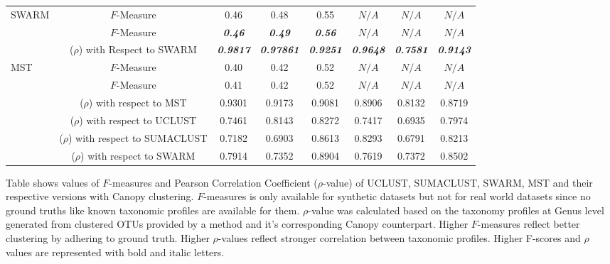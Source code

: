 \documentclass[10pt, conference, compsocconf]{IEEEtran}
\begin{document}
\begin{table}[t]
{\begin{tabular}{|l|c c c c| c c c|}
			\hline
			
			\multirow{1}{*}{SWARM} & $F$-Measure & 0.46 & 0.48 & 0.55 & $N/A$ & $N/A$ & $N/A$\\
			
			\hdashline
			
			\multirow{2}{*}{CC$_{SWARM}$} & $F$-Measure & \textit{\textbf{0.46}} & \textit{\textbf{0.49}} & \textit{\textbf{0.56}} & $N/A$ & $N/A$ & $N/A$\\
			& ($\rho$) with Respect to SWARM & \textit{\textbf{0.9817}} & \textit{\textbf{0.97861}} & \textit{\textbf{0.9251}} & \textit{\textbf{0.9648}} & \textit{\textbf{0.7581}} & \textit{\textbf{0.9143}}\\
			
			\hline
			
			\multirow{1}{*}{MST} & $F$-Measure & 0.40 & 0.42 & 0.52 & $N/A$ & $N/A$ & $N/A$\\
			
			\hdashline
			
			\multirow{5}{*}{CC$_{MST}$} & $F$-Measure & 0.41 & 0.42 & 0.52 & $N/A$ & $N/A$ & $N/A$\\& ($\rho$) with respect to MST & 0.9301 & 0.9173 & 0.9081 & 0.8906 & 0.8132 & 0.8719  \\
			& ($\rho$) with respect to UCLUST & 0.7461 & 0.8143 & 0.8272 & 0.7417 & 0.6935 & 0.7974 \\ & ($\rho$) with respect to SUMACLUST & 0.7182 & 0.6903 & 0.8613 & 0.8293 & 0.6791 & 0.8213 \\  & ($\rho$) with respect to SWARM & 0.7914 & 0.7352 & 0.8904 & 0.7619 & 0.7372 & 0.8502 \\ 
			
			
			\hline
			
		\end{tabular}
	}
	\small
	\begin{tablenotes}
		\item Table shows values of $F$-measures and Pearson Correlation Coefficient ($\rho$-value) of UCLUST, SUMACLUST, SWARM, MST and their respective versions with Canopy clustering. $F$-measures is only available for synthetic datasets but not for real world datasets since no ground truths like known taxonomic profiles are available for them. $\rho$-value was calculated based on the taxonomy profiles at Genus level generated from clustered OTUs provided by a method and it's corresponding Canopy counterpart. Higher $F$-measures reflect better clustering by adhering to ground truth. Higher $\rho$-values reflect stronger correlation between taxonomic profiles. Higher F-scores and $\rho$ values are represented with bold and italic letters.         
	\end{tablenotes}
	
\end{table}
\end{document}
